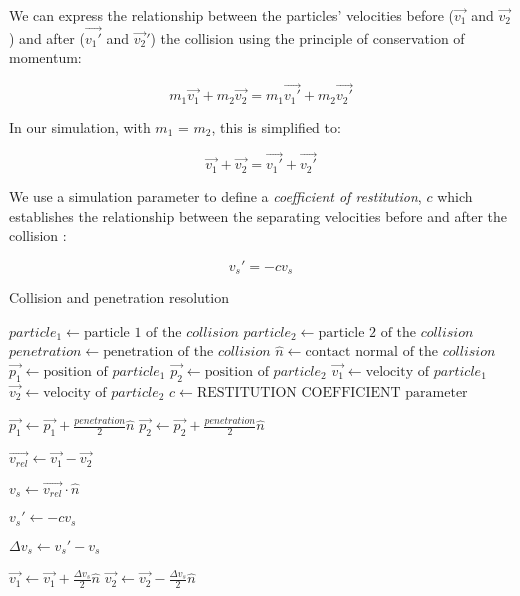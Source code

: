 \documentclass[manuscript, screen]{timtm}
\begin{document}
We can express the relationship between the particles' velocities before ($\vec{v_1}$ and $\vec{v_2}$) and after ($\vec{v_1'}$ and $\vec{v_2}'$) the collision using the principle of conservation of momentum:

\[
m_1\vec{v_1} + m_2\vec{v_2} = m_1\vec{v_1'} + m_2\vec{v_2'} 
\]

In our simulation, with $m_1$ = $m_2$, this is simplified to:

\[
\vec{v_1} + \vec{v_2} = \vec{v_1'} + \vec{v_2'} 
\]

We use a simulation parameter to define a \textit{coefficient of restitution}, $c$ which establishes the relationship between the separating velocities before and after the collision \cite{game-physics-millington}:

\[
v_s' = -c v_s
\]

\begin{algorithm}
\caption{Collision and penetration resolution} \label{algo:collision-resolution}
\begin{algorithmic}[1]


    \State $particle_1 \gets \text{particle 1 of the $collision$}$
    \State $particle_2 \gets \text{particle 2 of the $collision$}$
    \State $penetration \gets \text{penetration of the $collision$}$
    \State $\hat{n} \gets \text{contact normal of the $collision$}$
    \State $\vec{p_1} \gets \text{position of $particle_1$}$
    \State $\vec{p_2} \gets \text{position of $particle_2$}$
    \State $\vec{v_1} \gets \text{velocity of $particle_1$}$
    \State $\vec{v_2} \gets \text{velocity of $particle_2$}$
    \State $c \gets \text{RESTITUTION COEFFICIENT parameter}$

    \State $\vec{p_1} \gets \vec{p_1} + \frac{penetration}{2} \hat{n} $
    \State $\vec{p_2} \gets \vec{p_2} + \frac{penetration}{2} \hat{n} $

    \State $\vec{v_{rel}} \gets \vec{v_1} - \vec{v_2}$

    \State $v_s \gets \vec{v_{rel}} \cdot \hat{n}$

    \State $v_s' \gets -c v_s$

    \State $\Delta v_s \gets v_s' - v_s$

    \State $\vec{v_1} \gets \vec{v_1} + \frac{\Delta v_s}{2} \hat{n}$
    \State $\vec{v_2} \gets \vec{v_2} - \frac{\Delta v_s}{2} \hat{n}$

\EndFor
\end{algorithmic}
\end{algorithm}
\end{document}
